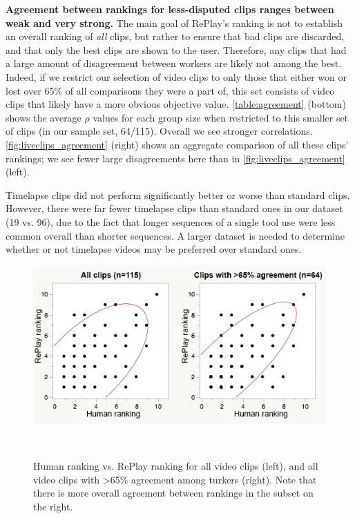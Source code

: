 \textbf{Agreement between rankings for less-disputed clips ranges between weak and very strong.} The main goal of RePlay's ranking is not to establish an overall ranking of \textit{all} clips, but rather to ensure that bad clips are discarded, and that only the best clips are shown to the user. Therefore, any clips that had a large amount of disagreement between workers are likely not among the best. Indeed, if we restrict our selection of video clips to only those that either won or lost over 65\% of all comparisons they were a part of, this set consists of video clips that likely have a more obvious objective value. \autoref{table:agreement} (bottom) shows the average $\rho$ values for each group size when restricted to this smaller set of clips (in our sample set, 64/115). Overall we see stronger correlations. \autoref{fig:liveclips_agreement} (right) shows an aggregate comparison of all these clips' rankings; we see fewer large disagreements here than in \autoref{fig:liveclips_agreement} (left).

Timelapse clips did not perform significantly better or worse than standard clips. However, there were far fewer timelapse clips than standard ones in our dataset (19 vs. 96), due to the fact that longer sequences of a single tool use were less common overall than shorter sequences. A larger dataset is needed to determine whether or not timelapse videos may be preferred over standard ones.

\begin{figure}[b]
\centering
  \includegraphics[width=\columnwidth]{liveclips/figures/agreement.png}
  \caption{Human ranking vs. RePlay ranking for all video clips (left), and all video clips with >65\% agreement among turkers (right). Note that there is more overall agreement between rankings in the subset on the right.}~\label{fig:liveclips_agreement}
\end{figure}

